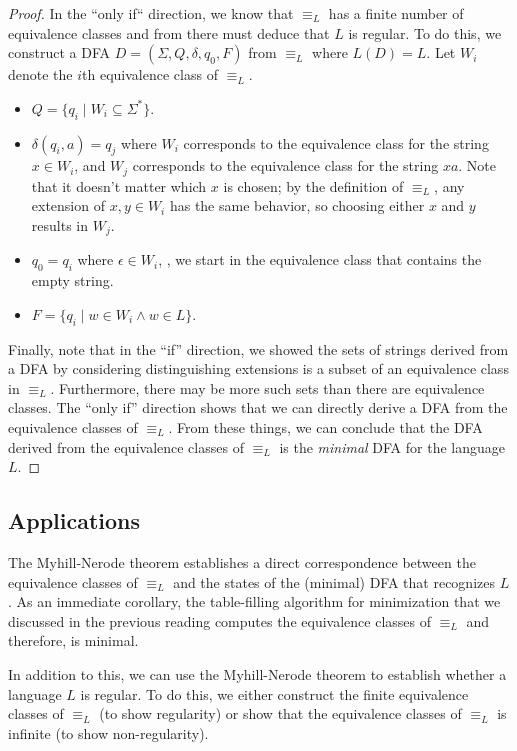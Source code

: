 \documentclass[11pt]{book}
\begin{document}
\begin{proof}
  In the ``only if`` direction, we know that $\equiv_L$ has a finite number of equivalence classes and from there must deduce that $L$ is regular.
  To do this, we construct a DFA $D = (\Sigma, Q, \delta, q_0, F)$ from $\equiv_L$ where $L(D) = L$.
  Let $W_i$ denote the $i$th equivalence class of $\equiv_L$.
  \begin{itemize}[itemsep=0pt]
    \item $Q = \{ q_i \;|\; W_i \subseteq \Sigma^* \}$.
    \item $\delta(q_i, a) = q_j$ where $W_i$ corresponds to the equivalence class for the string $x \in W_i$, and $W_j$ corresponds to the equivalence class for the string $xa$.
      Note that it doesn't matter which $x$ is chosen; by the definition of $\equiv_L$, any extension of $x, y \in W_i$ has the same behavior, so choosing either $x$ and $y$ results in $W_j$.
    \item $q_0 = q_i$ where $\epsilon \in W_i$, \ie, we start in the equivalence class that contains the empty string.
    \item $F = \{ q_i \;|\; w \in W_i \wedge w \in L \}$.
  \end{itemize}

  Finally, note that in the ``if'' direction, we showed the sets of strings derived from a DFA by considering distinguishing extensions is a subset of an equivalence class in $\equiv_L$.
  Furthermore, there may be more such sets than there are equivalence classes.
  The ``only if'' direction shows that we can directly derive a DFA from the equivalence classes of $\equiv_L$.
  From these things, we can conclude that the DFA derived from the equivalence classes of $\equiv_L$ is the \emph{minimal} DFA for the language $L$.
\end{proof}

\subsection*{Applications}

The Myhill-Nerode theorem establishes a direct correspondence between the equivalence classes of $\equiv_L$ and the states of the (minimal) DFA that recognizes $L$.
As an immediate corollary, the table-filling algorithm for minimization that we discussed in the previous reading computes the equivalence classes of $\equiv_L$ and therefore, is minimal.

In addition to this, we can use the Myhill-Nerode theorem to establish whether a language $L$ is regular.
To do this, we either construct the finite equivalence classes of $\equiv_L$ (to show regularity) or show that the equivalence classes of $\equiv_L$ is infinite (to show non-regularity).
\end{document}
